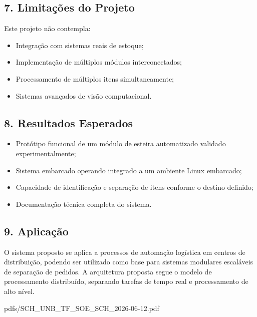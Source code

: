 \subsection*{7. Limitações do Projeto}

Este projeto não contempla:

\begin{itemize}
    \item Integração com sistemas reais de estoque;
    \item Implementação de múltiplos módulos interconectados;
    \item Processamento de múltiplos itens simultaneamente;
    \item Sistemas avançados de visão computacional.
\end{itemize}

\subsection*{8. Resultados Esperados}

\begin{itemize}
    \item Protótipo funcional de um módulo de esteira automatizado validado
          experimentalmente;
    \item Sistema embarcado operando integrado a um ambiente Linux embarcado;
    \item Capacidade de identificação e separação de itens conforme o destino
          definido;
    \item Documentação técnica completa do sistema.
\end{itemize}

\subsection*{9. Aplicação}

O sistema proposto se aplica a processos de automação logística em centros de
distribuição, podendo ser utilizado como base para sistemas modulares escaláveis
de separação de pedidos. A arquitetura proposta segue o modelo de processamento
distribuído, separando tarefas de tempo real e processamento de alto nível.



           {pdfs/SCH_UNB_TF_SOE_SCH_2026-06-12.pdf}